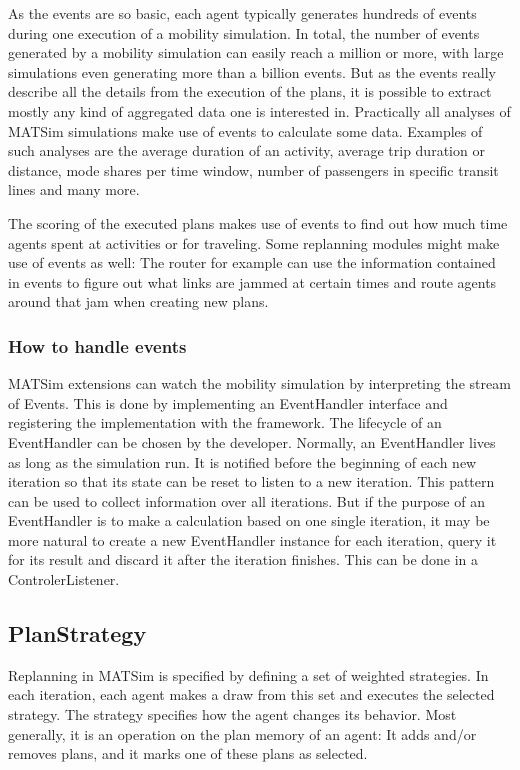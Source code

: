 As the events are so basic, each agent typically generates hundreds of events during one execution of a mobility simulation. In total, the number of events generated by a mobility simulation can easily reach a million or more, with large simulations even generating more than a billion events. But as the events really describe all the details from the execution of the plans, it is possible to extract mostly any kind of aggregated data one is interested in. Practically all analyses of MATSim simulations make use of events to calculate some data. Examples of such analyses are the average duration of an activity, average trip duration or distance, mode shares per time window, number of passengers in specific transit lines and many more.

The scoring of the executed plans makes use of events to find out how much time agents spent at activities or for traveling. Some replanning modules might make use of events as well: The router for example can use the information contained in events to figure out what links are jammed at certain times and route agents around that jam when creating new plans.

\subsubsection{How to handle events}
MATSim extensions can watch the mobility simulation by interpreting the stream of Events. This is done
by implementing an EventHandler interface and registering the implementation with the framework. The lifecycle of
an EventHandler can be chosen by the developer. Normally, an EventHandler lives as long as the simulation run.
It is notified before the beginning of each new iteration so that its state can be reset to listen to a new
iteration. This pattern can be used to collect information over all iterations. But if the purpose of
an EventHandler is to make a calculation based on one single iteration, it may be more natural
to create a new EventHandler instance for each iteration, query it for its result and discard it
after the iteration finishes. This can be done in a ControlerListener.

\subsection{PlanStrategy}
\label{sec:replanning-extension-point}

Replanning in MATSim is specified by defining a set of weighted strategies. In each
iteration, each agent makes a draw from this set and executes the selected strategy. The
strategy specifies how the agent changes its behavior. Most generally, it is an operation on the plan memory
of an agent: It adds and/or removes plans, and it marks one of these plans as selected.

